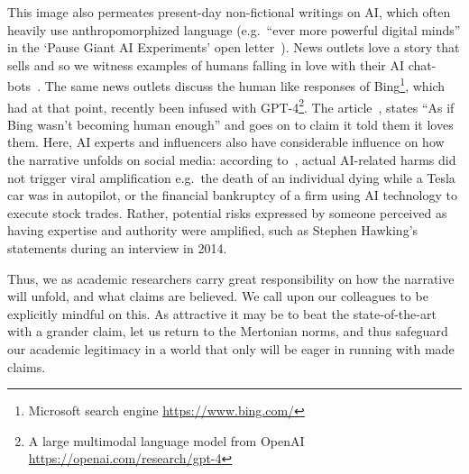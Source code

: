 \documentclass{article}
\theoremstyle{plain}
\theoremstyle{definition}
\theoremstyle{remark}
\begin{document}
This image also permeates present-day non-fictional writings on AI, which often heavily use anthropomorphized language (e.g.\ ``ever more powerful digital minds'' in the `Pause Giant AI Experiments' open letter~\cite{pauseai}). News outlets love a story that sells and so we witness examples of humans falling in love with their AI chat-bots~\cite{replika,nytimesailove}. The same news outlets discuss the human like responses of Bing\footnote{Microsoft search engine \url{https://www.bing.com/}}, which had at that point, recently been infused with GPT-4\footnote{A large multimodal language model from OpenAI \url{https://openai.com/research/gpt-4}}. The article~\cite{nytimesbing}, states ``As if Bing wasn’t becoming human enough'' and goes on to claim it told them it loves them. Here, AI experts and influencers also have considerable influence on how the narrative unfolds on social media: according to~\citet{neri2020role}, actual AI-related harms did not trigger viral amplification e.g.\ the death of an individual dying while a Tesla car was in autopilot, or the financial bankruptcy of a firm using AI technology to execute stock trades. Rather, potential risks expressed by someone perceived as having expertise and authority were amplified, such as Stephen Hawking's statements during an interview in 2014.

Thus, we as academic researchers carry great responsibility on how the narrative will unfold, and what claims are believed. We call upon our colleagues to be explicitly mindful on this. As attractive it may be to beat the state-of-the-art with a grander claim, let us return to the Mertonian norms, and thus safeguard our academic legitimacy in a world that only will be eager in running with made claims.




\end{document}
